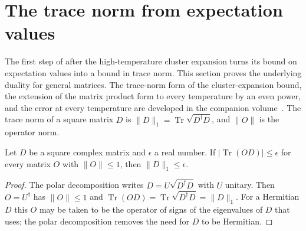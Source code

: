 \section{The trace norm from expectation values}
\label{sec:hastings_thermal_trace_norm}


The first step of \cite[Section~IV]{Hastings2006Solving} after the
high-temperature cluster expansion turns its bound on expectation values into
a bound in trace norm. This section proves the underlying duality for general
matrices. The trace-norm form of the cluster-expansion bound, the extension of
the matrix product form to every temperature by an even power, and the error
at every temperature are developed in the companion volume~\cite[``The trace-norm bound and every temperature in Hastings' thermal expansion'']{QICLean2026Blueprint}.
The trace norm of a square matrix $D$ is
$\|D\|_1=\operatorname{Tr}\sqrt{D^\dagger D}$, and $\|O\|$ is the operator norm.

\begin{lemma}
    \label{thm:hastings_thermal_trace_norm_duality}
    \leanok
    Let $D$ be a square complex matrix and $\epsilon$ a real number. If
    $|\operatorname{Tr}(OD)|\le\epsilon$ for every matrix $O$ with
    $\|O\|\le1$, then $\|D\|_1\le\epsilon$.
\end{lemma}
\begin{proof}\leanok
    The polar decomposition writes $D=U\sqrt{D^\dagger D}$ with $U$ unitary.
    Then $O=U^\dagger$ has $\|O\|\le1$ and
    $\operatorname{Tr}(OD)=\operatorname{Tr}\sqrt{D^\dagger D}=\|D\|_1$. For a
    Hermitian $D$ this $O$ may be taken to be the operator of signs of the
    eigenvalues of $D$ that \cite[lines 1291--1294]{Hastings2006Solving} uses;
    the polar decomposition removes the need for $D$ to be Hermitian.
\end{proof}

